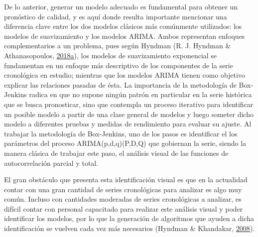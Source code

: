 \documentclass[]{article}
\begin{document}
De lo anterior, generar un modelo adecuado es fundamental para obtener
un pronóstico de calidad, y es aquí donde resulta importante mencionar
una diferencia clave entre los dos modelos clásicos más comúnmente
utilizados: los modelos de suavizamiento y los modelos ARIMA. Ambos
representan enfoques complementarios a un problema, pues según Hyndman
(R. J. Hyndman \& Athanasopoulos,
\protect\hyperlink{ref-hyndman2018forecasting}{2018}\protect\hyperlink{ref-hyndman2018forecasting}{a}),
los modelos de suavizamiento exponencial se fundamentan en un enfoque
más descriptivo de los componentes de la serie cronológica en estudio;
mientras que los modelos ARIMA tienen como objetivo explicar las
relaciones pasadas de ésta. La importancia de la metodología de
Box-Jenkins radica en que no supone ningún patrón en particular en la
serie histórica que se busca pronosticar, sino que contempla un proceso
iterativo para identificar un posible modelo a partir de una clase
general de modelos y luego someter dicho modelo a diferentes pruebas y
medidas de rendimiento para evaluar su ajuste. Al trabajar la
metodología de Box-Jenkins, uno de los pasos es identificar el los
parámetros del proceso ARIMA(p,d,q)(P,D,Q) que gobiernan la serie,
siendo la manera clásica de trabajar este paso, el análisis visual de
las funciones de autocorrelación parcial y total.

El gran obstáculo que presenta esta identificación visual es que en la
actualidad contar con una gran cantidad de series cronológicas para
analizar es algo muy común. Incluso con cantidades moderadas de series
cronológicas a analizar, es difícil contar con personal capacitado para
realizar este análisis visual y poder identificar los modelos, por lo
que la generación de algoritmos que ayuden a dicha identificación se
vuelven cada vez más necesarios (Hyndman \& Khandakar,
\protect\hyperlink{ref-auto.arima}{2008}).
\end{document}
